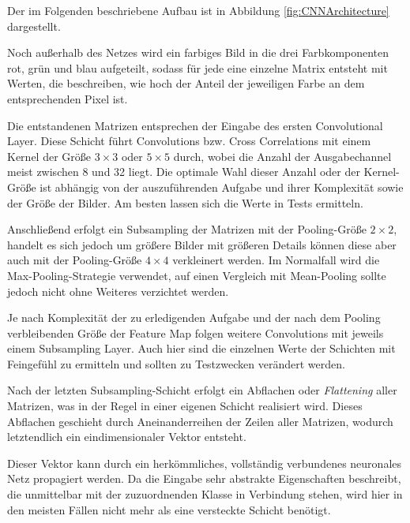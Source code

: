 \documentclass[12pt,a4]{article}
\begin{document}
Der im Folgenden beschriebene Aufbau ist in Abbildung \ref{fig:CNNArchitecture} dargestellt.

Noch außerhalb des Netzes wird ein farbiges Bild in die drei Farbkomponenten rot, grün und blau aufgeteilt, sodass für jede eine einzelne Matrix entsteht mit Werten, die beschreiben, wie hoch der Anteil der jeweiligen Farbe an dem entsprechenden Pixel ist.

Die entstandenen Matrizen entsprechen der Eingabe des ersten Convolutional Layer. Diese Schicht führt Convolutions bzw. Cross Correlations mit einem Kernel der Größe $3 \times 3$ oder $5 \times 5$ durch, wobei die Anzahl der Ausgabechannel meist zwischen 8 und 32 liegt. Die optimale Wahl dieser Anzahl oder der Kernel-Größe ist abhängig von der auszuführenden Aufgabe und ihrer Komplexität sowie der Größe der Bilder. Am besten lassen sich die Werte in Tests ermitteln.

Anschließend erfolgt ein Subsampling der Matrizen mit der Pooling-Größe $2 \times 2$, handelt es sich jedoch um größere Bilder mit größeren Details können diese aber auch mit der Pooling-Größe $4 \times 4$ verkleinert werden. Im Normalfall wird die Max-Pooling-Strategie verwendet, auf einen Vergleich mit Mean-Pooling sollte jedoch nicht ohne Weiteres verzichtet werden.

Je nach Komplexität der zu erledigenden Aufgabe und der nach dem Pooling verbleibenden Größe der Feature Map folgen weitere Convolutions mit jeweils einem Subsampling Layer. Auch hier sind die einzelnen Werte der Schichten mit Feingefühl zu ermitteln und sollten zu Testzwecken verändert werden.

Nach der letzten Subsampling-Schicht erfolgt ein Abflachen oder \textit{Flattening} aller Matrizen, was in der Regel in einer eigenen Schicht realisiert wird. Dieses Abflachen geschieht durch Aneinanderreihen der Zeilen aller Matrizen, wodurch letztendlich ein eindimensionaler Vektor entsteht.

Dieser Vektor kann durch ein herkömmliches, vollständig verbundenes neuronales Netz propagiert werden. Da die Eingabe sehr abstrakte Eigenschaften beschreibt, die unmittelbar mit der zuzuordnenden Klasse in Verbindung stehen, wird hier in den meisten Fällen nicht mehr als eine versteckte Schicht benötigt.
\end{document}
